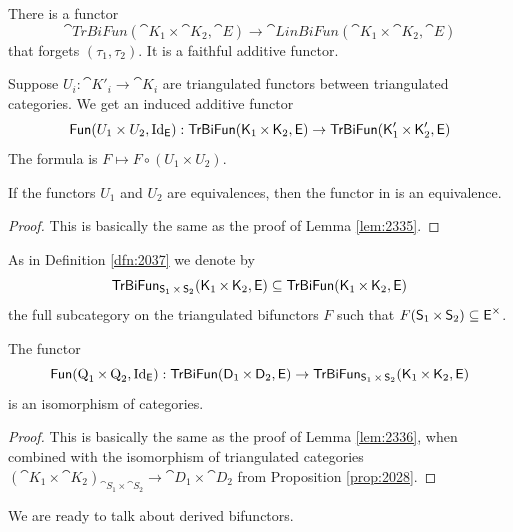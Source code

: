 There is a functor 
\begin{equation} \label{eqn:3130}
\cat{TrBiFun}(\cat{K}_1 \times \cat{K}_2, \cat{E}) \to 
\cat{LinBiFun}(\cat{K}_1 \times \cat{K}_2, \cat{E}) 
\end{equation}
that forgets $(\tau_1, \tau_2)$. It is a faithful additive functor. 

Suppose $U_i : \cat{K}'_i \to \cat{K}_i$ are triangulated functors between 
triangulated categories. We get an induced additive functor
\begin{equation} \label{eqn:2036}
\operatorname{\mathsf{Fun}}(U_1 \times U_2, \operatorname{Id}_{\operatorname{\mathsf{E}}}) :
\operatorname{\mathsf{TrBiFun}}(\operatorname{\mathsf{K}}_1 \times \operatorname{\mathsf{K}}_2, \operatorname{\mathsf{E}}) \to 
\operatorname{\mathsf{TrBiFun}}(\operatorname{\mathsf{K}}'_1 \times \operatorname{\mathsf{K}}'_2, \operatorname{\mathsf{E}})
\end{equation}
The formula is 
$F \mapsto F \circ (U_1 \times U_2)$.

\begin{lem} \label{lem:2035}
If the functors $U_1$ and $U_2$ are equivalences, then the functor 
in \tup{(\ref{eqn:2036})} is an equivalence.
\end{lem}

\begin{proof}
This is basically the same as the proof of Lemma \ref{lem:2335}.
\end{proof}

As in Definition \ref{dfn:2037} we denote by 
\[ \operatorname{\mathsf{TrBiFun}}_{\operatorname{\mathsf{S}}_1 \times \operatorname{\mathsf{S}}_2}
(\operatorname{\mathsf{K}}_1 \times \operatorname{\mathsf{K}}_2, \operatorname{\mathsf{E}}) \subseteq 
\operatorname{\mathsf{TrBiFun}}(\operatorname{\mathsf{K}}_1 \times \operatorname{\mathsf{K}}_2, \operatorname{\mathsf{E}}) \]
the full subcategory on the triangulated bifunctors $F$ such that 
$F(\operatorname{\mathsf{S}}_1 \times \operatorname{\mathsf{S}}_2) \subseteq \operatorname{\mathsf{E}}^{\times}$. 

\begin{lem} \label{lem:2036} 
The functor 
\[ \operatorname{\mathsf{Fun}}(\operatorname{Q}_1 \times \operatorname{Q}_2, \operatorname{Id}_{\operatorname{\mathsf{E}}}) :
\operatorname{\mathsf{TrBiFun}}(\operatorname{\mathsf{D}}_1 \times \operatorname{\mathsf{D}}_2, \operatorname{\mathsf{E}}) \to 
\operatorname{\mathsf{TrBiFun}}_{\operatorname{\mathsf{S}}_1 \times \operatorname{\mathsf{S}}_2} (\operatorname{\mathsf{K}}_1 \times \operatorname{\mathsf{K}}_2, \operatorname{\mathsf{E}})
\]
is an isomorphism of categories. 
\end{lem}

\begin{proof}
This is basically the same as the proof of Lemma \ref{lem:2336}, when 
combined with the isomorphism of triangulated categories 
$(\cat{K}_1 \times \cat{K}_2)_{\cat{S}_1 \times \cat{S}_2} \to 
\cat{D}_1 \times \cat{D}_2$ 
from Proposition \ref{prop:2028}. 
\end{proof}

We are ready to talk about derived bifunctors.  

